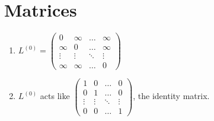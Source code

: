 \documentclass[11pt]{article}
\begin{document}
\section{Matrices}
\begin{enumerate}
\item
  \(L^{(0)}=\begin{pmatrix} 0 & \infty & \hdots & \infty \\ \infty & 0 & \hdots & \infty \\ \vdots & \vdots & \ddots & \vdots \\ \infty & \infty & \hdots & 0 \end{pmatrix}\)
\item
  \(L^{(0)}\) acts like \(\begin{pmatrix} 1 & 0 & \hdots & 0 \\ 0 & 1 & \hdots & 0 \\ \vdots & \vdots & \ddots & \vdots \\ 0 & 0 & \hdots & 1 \end{pmatrix}\), the identity matrix.
\end{enumerate}
\end{document}
